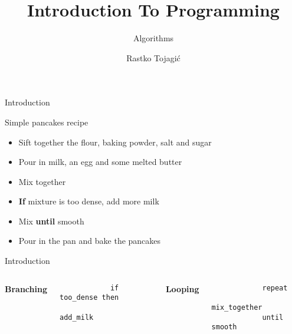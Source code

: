 \documentclass{beamer}
\title{Introduction To Programming}
\subtitle{Algorithms}
\author{Rastko Tojagi\'c}
\institute{%
    CS Class
}
\date{}
\newcommand{\bfemph}[1]{\textbf{#1}}
\renewcommand{\emph}[1]{\bfemph{#1}}
\begin{document}
\begin{frame}
   \titlepage
\end{frame}

\begin{frame}{Introduction}

    Simple pancakes recipe

    \bigskip

    \begin{itemize}
        \item Sift together the flour, baking powder, salt and sugar
        \pause
        \item Pour in milk, an egg and some melted butter
        \pause
        \item Mix together
        \pause
        \item \emph{If} mixture is too dense, add more milk 
        \pause
        \item Mix \emph{until} smooth
        \pause
        \item Pour in the pan and bake the pancakes
    \end{itemize}

\end{frame}

\begin{frame}[fragile]{Introduction}
\begin{columns}
    \emph{Branching}
        \begin{verbatim}
            if too_dense then
                add_milk
        \end{verbatim}

    
        \emph{Looping}
        \begin{verbatim}
            repeat
                mix_together
            until smooth
        \end{verbatim}
\end{columns}        

\end{frame}
\end{document}
